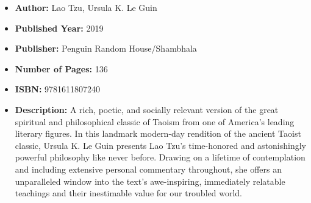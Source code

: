 \documentclass{tufte-handout}
\begin{document}
\begin{itemize}
    \item[] \textbf{Author:} Lao Tzu, Ursula K. Le Guin
    \item[] \textbf{Published Year:} 2019
    \item[] \textbf{Publisher:} Penguin Random House/Shambhala
    \item[] \textbf{Number of Pages:} 136      
    \item[] \textbf{ISBN:} 9781611807240
    \item[] \textbf{Description:} A rich, poetic, and socially relevant version of the great spiritual and philosophical classic of Taoism from one of America’s leading literary figures. In this landmark modern-day rendition of the ancient Taoist classic, Ursula K. Le Guin presents Lao Tzu’s time-honored and astonishingly powerful philosophy like never before. Drawing on a lifetime of contemplation and including extensive personal commentary throughout, she offers an unparalleled window into the text’s awe-inspiring, immediately relatable teachings and their inestimable value for our troubled world.
\end{itemize}
\end{document}
